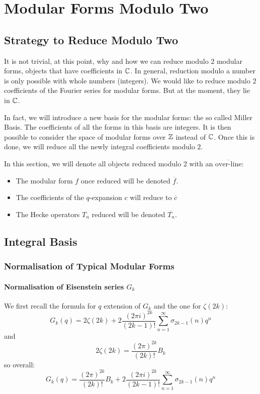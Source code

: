 \section{Modular Forms Modulo Two}
\subsection{Strategy to Reduce Modulo Two}
It is not trivial, at this point, why and how we can reduce modulo 2 modular forms, objects that have coefficients in $\mathbb{C}$.
In general, reduction modulo a number is only possible with whole numbers (integers).
We would like to reduce modulo 2 coefficients of the Fourier series for modular forms.
But at the moment, they lie in $\mathbb{C}$.

In fact, we will introduce a new basis for the modular forms: the so called Miller Basis.
The coefficients of all the forms in this basis are integers. It is then possible to consider the space of modular forms over $\mathbb{Z}$ instead of $\mathbb{C}$.
Once this is done, we will reduce all the newly integral coefficients modulo $2$.

In this section, we will denote all objects reduced modulo 2 with an $\overline{\text{over-line}}$:
\begin{itemize}
	\item The modular form $f$ once reduced will be denoted $\overline{f}$.	\item The coefficients of the $q$-expansion $c$ will reduce to $\overline{c}$
	\item The Hecke operators $T_n$ reduced will be denoted $\overline{T_n}$.
\end{itemize}

\subsection{Integral Basis}
\subsubsection{Normalisation of Typical Modular Forms}
\paragraph{Normalisation of Eisenstein series $G_k$}
We first recall the formula for $q$ extension of $G_k$ and the one for $\zeta(2k)$:
$$
G_k(q) = 2\zeta(2k) + 2 \frac{{(2 \pi i)}^{2k}}{(2k-1)!} \sum_{n=1}^{\infty} \sigma_{2k-1}(n)q^n
$$
and
$$
2\zeta(2k) = \frac{(2\pi)^{2k}}{(2k)!}B_k
$$
so overall:
$$
G_k(q) = \frac{(2\pi)^{2k}}{(2k)!}B_k + 2 \frac{{(2 \pi i)}^{2k}}{(2k-1)!} \sum_{n=1}^{\infty} \sigma_{2k-1}(n)q^n
$$

